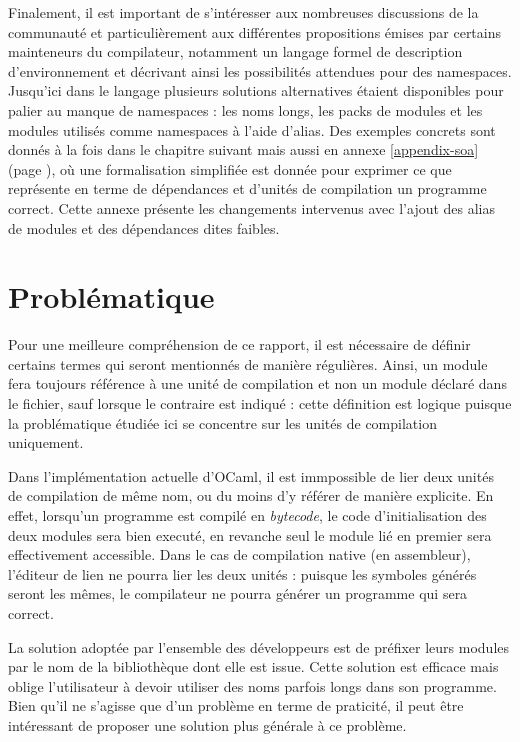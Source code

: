 \documentclass[11pt,a4paper]{report}
\begin{document}
Finalement, il est important de s'intéresser aux nombreuses discussions de la
communauté\cite{ocaml-platform} et particulièrement aux différentes propositions
émises par certains mainteneurs du compilateur\cite{ocaml-proposals}, notamment
un langage formel de description d'environnement\cite{remy-scherer-prop} et
décrivant ainsi les possibilités attendues pour des namespaces. Jusqu'ici dans
le langage plusieurs solutions alternatives étaient disponibles pour palier au
manque de namespaces : les noms longs, les packs de modules et les modules
utilisés comme namespaces à l'aide d'alias. Des exemples concrets sont donnés à
la fois dans le chapitre suivant mais aussi en annexe \ref{appendix-soa} (page
\pageref{appendix-soa}), où une formalisation simplifiée est donnée pour
exprimer ce que représente en terme de dépendances et d'unités de compilation un
programme correct. Cette annexe présente les changements intervenus avec l'ajout
des alias de modules et des dépendances dites faibles.

\chapter{Problématique}

Pour une meilleure compréhension de ce rapport, il est nécessaire de définir
certains termes qui seront mentionnés de manière régulières. Ainsi, un module
fera toujours référence à une unité de compilation et non un module déclaré dans
le fichier, sauf lorsque le contraire est indiqué : cette définition est logique
puisque la problématique étudiée ici se concentre sur les unités de compilation
uniquement. 

Dans l'implémentation actuelle d'OCaml, il est immpossible de lier deux unités
de compilation de même nom, ou du moins d'y référer de manière explicite. En
effet, lorsqu'un programme est compilé en \emph{bytecode}, le code
d'initialisation des deux modules sera bien executé, en revanche seul le module
lié en premier sera effectivement accessible. Dans le cas de compilation native
(en assembleur), l'éditeur de lien ne pourra lier les deux unités : puisque les
symboles générés seront les mêmes, le compilateur ne pourra générer un programme
qui sera correct.

La solution adoptée par l'ensemble des développeurs est de préfixer leurs
modules par le nom de la bibliothèque dont elle est issue. Cette solution est
efficace mais oblige l'utilisateur à devoir utiliser des noms parfois longs dans
son programme. Bien qu'il ne s'agisse que d'un problème en terme de praticité,
il peut être intéressant de proposer une solution plus générale à ce problème.
\end{document}
